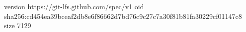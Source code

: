 version https://git-lfs.github.com/spec/v1
oid sha256:cd454ea39bceaf2db8e6f86662d7bd76c9c27c7a30f81b81fa30229cf01147c8
size 7129
